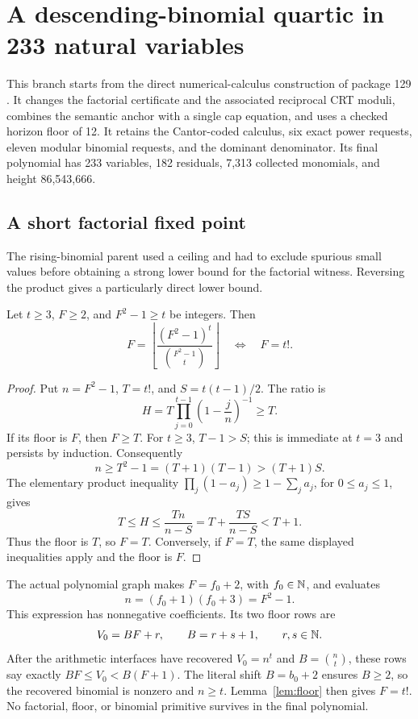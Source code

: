 \section{A descending-binomial quartic in 233 natural variables}
\label{sec:natural}

This branch starts from the direct numerical-calculus construction of
package 129 \cite{parent129}. It changes the factorial certificate and
the associated reciprocal CRT moduli, combines the semantic anchor with
a single cap equation, and uses a checked horizon floor of 12. It
retains the Cantor-coded calculus, six exact power requests, eleven
modular binomial requests, and the dominant denominator. Its final
polynomial has 233 variables, 182 residuals, 7,313 collected monomials,
and height 86,543,666.

\subsection{A short factorial fixed point}

The rising-binomial parent used a ceiling and had to exclude spurious
small values before obtaining a strong lower bound for the factorial
witness. Reversing the product gives a particularly direct lower bound.

\begin{lemma}\label{lem:floor}
Let \(t\ge3\), \(F\ge2\), and \(F^2-1\ge t\) be integers. Then
\[
 F=\left\lfloor\frac{(F^2-1)^t}{\binom{F^2-1}{t}}\right\rfloor
 \quad\Longleftrightarrow\quad F=t!.
\]
\end{lemma}

\begin{proof}
Put \(n=F^2-1\), \(T=t!\), and \(S=t(t-1)/2\). The ratio is
\[
 H=T\prod_{j=0}^{t-1}\left(1-\frac{j}{n}\right)^{-1}\ge T.
\]
If its floor is \(F\), then \(F\ge T\). For \(t\ge3\),
\(T-1>S\); this is immediate at \(t=3\) and persists by induction.
Consequently
\[
 n\ge T^2-1=(T+1)(T-1)>(T+1)S.
\]
The elementary product inequality
\(\prod_j(1-a_j)\ge1-\sum_j a_j\), for \(0\le a_j\le1\), gives
\[
 T\le H\le\frac{Tn}{n-S}
       =T+\frac{TS}{n-S}<T+1.
\]
Thus the floor is \(T\), so \(F=T\). Conversely, if \(F=T\),
the same displayed inequalities apply and the floor is \(F\).
\end{proof}

The actual polynomial graph makes \(F=f_0+2\), with \(f_0\in\mathbb N\),
and evaluates
\[
 n=(f_0+1)(f_0+3)=F^2-1.
\]
This expression has nonnegative coefficients. Its two floor rows are
\begin{equation}\label{eq:floor-rows}
 V_0=BF+r,\qquad B=r+s+1,\qquad r,s\in\mathbb N.
\end{equation}
After the arithmetic interfaces have recovered
\(V_0=n^t\) and \(B=\binom nt\), these rows say exactly
\(BF\le V_0<B(F+1)\). The literal shift \(B=b_0+2\) ensures
\(B\ge2\), so the recovered binomial is nonzero and \(n\ge t\).
Lemma~\ref{lem:floor} then gives \(F=t!\). No factorial, floor, or
binomial primitive survives in the final polynomial.

